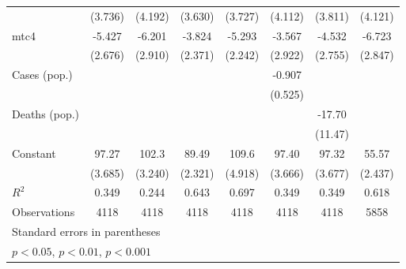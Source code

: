 \documentclass{article}
\begin{document}
{\begin{longtable}{l*{7}{c}}
                &  (3.736)         &  (4.192)         &  (3.630)         &  (3.727)         &  (4.112)         &  (3.811)         &  (4.121)         \\
mtc4            &   -5.427         &   -6.201\sym{*}  &   -3.824         &   -5.293\sym{*}  &   -3.567         &   -4.532         &   -6.723\sym{*}  \\
                &  (2.676)         &  (2.910)         &  (2.371)         &  (2.242)         &  (2.922)         &  (2.755)         &  (2.847)         \\
Cases (pop.)    &                  &                  &                  &                  &   -0.907         &                  &                  \\
                &                  &                  &                  &                  &  (0.525)         &                  &                  \\
Deaths (pop.)   &                  &                  &                  &                  &                  &   -17.70         &                  \\
                &                  &                  &                  &                  &                  &  (11.47)         &                  \\
Constant        &    97.27\sym{***}&    102.3\sym{***}&    89.49\sym{***}&    109.6\sym{***}&    97.40\sym{***}&    97.32\sym{***}&    55.57\sym{***}\\
                &  (3.685)         &  (3.240)         &  (2.321)         &  (4.918)         &  (3.666)         &  (3.677)         &  (2.437)         \\
\hline
\(R^{2}\)       &    0.349         &    0.244         &    0.643         &    0.697         &    0.349         &    0.349         &    0.618         \\
Observations    &     4118         &     4118         &     4118         &     4118         &     4118         &     4118         &     5858         \\
\hline\hline
\multicolumn{8}{l}{\footnotesize Standard errors in parentheses}\\
\multicolumn{8}{l}{\footnotesize \sym{*} \(p<0.05\), \sym{**} \(p<0.01\), \sym{***} \(p<0.001\)}\\
\end{longtable}
}
\end{document}
